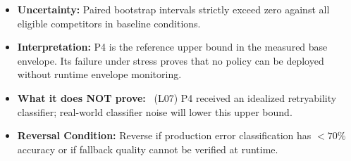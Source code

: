 \begin{itemize}
    \item \textbf{Uncertainty:} Paired bootstrap intervals strictly exceed zero against all eligible competitors in baseline conditions.
    \item \textbf{Interpretation:} P4 is the reference upper bound in the measured base envelope. Its failure under stress proves that no policy can be deployed without runtime envelope monitoring.
    \item \textbf{What it does NOT prove:} \LIMITATION\ (L07) P4 received an idealized retryability classifier; real-world classifier noise will lower this upper bound.
    \item \textbf{Reversal Condition:} Reverse if production error classification has $<70\%$ accuracy or if fallback quality cannot be verified at runtime.
\end{itemize}
\endgroup
